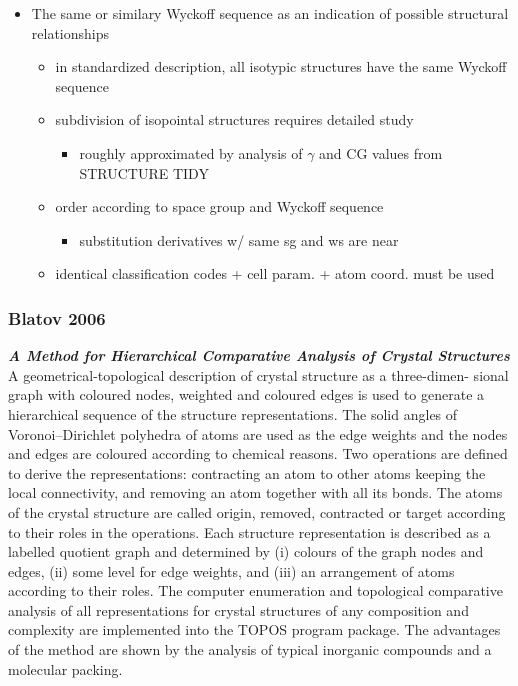 \documentclass[11pt]{article}
\providecommand{\tightlist}{%
      \setlength{\itemsep}{0pt}\setlength{\parskip}{0pt}}
\begin{document}
\begin{itemize}
\tightlist
\item
  The same or similary Wyckoff sequence as an indication of possible
  structural relationships

  \begin{itemize}
  \tightlist
  \item
    in standardized description, all isotypic structures have the same
    Wyckoff sequence
  \item
    subdivision of isopointal structures requires detailed study

    \begin{itemize}
    \tightlist
    \item
      roughly approximated by analysis of \(\gamma\) and CG values from
      STRUCTURE TIDY
    \end{itemize}
  \item
    order according to space group and Wyckoff sequence

    \begin{itemize}
    \tightlist
    \item
      substitution derivatives w/ same sg and ws are near
    \end{itemize}
  \item
    identical classification codes + cell param. + atom coord. must be
    used
  \end{itemize}
\end{itemize}

    \subsubsection{Blatov 2006}\label{blatov-2006}

\textbf{\emph{A Method for Hierarchical Comparative Analysis of Crystal
Structures}} A geometrical-topological description of crystal structure
as a three-dimen- sional graph with coloured nodes, weighted and
coloured edges is used to generate a hierarchical sequence of the
structure representations. The solid angles of Voronoi--Dirichlet
polyhedra of atoms are used as the edge weights and the nodes and edges
are coloured according to chemical reasons. Two operations are defined
to derive the representations: contracting an atom to other atoms
keeping the local connectivity, and removing an atom together with all
its bonds. The atoms of the crystal structure are called origin,
removed, contracted or target according to their roles in the
operations. Each structure representation is described as a labelled
quotient graph and determined by (i) colours of the graph nodes and
edges, (ii) some level for edge weights, and (iii) an arrangement of
atoms according to their roles. The computer enumeration and topological
comparative analysis of all representations for crystal structures of
any composition and complexity are implemented into the TOPOS program
package. The advantages of the method are shown by the analysis of
typical inorganic compounds and a molecular packing.
\end{document}
